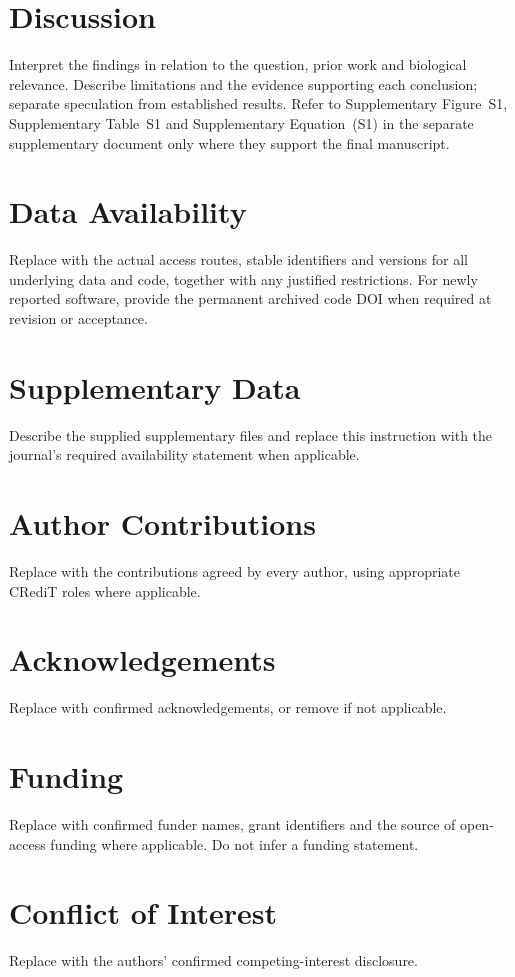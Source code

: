 \documentclass[unnumsec,webpdf,modern,large]{oup-authoring-template}
\begin{document}
\section{Discussion}\label{sec:discussion}
Interpret the findings in relation to the question, prior work and
biological relevance. Describe limitations and the evidence supporting
each conclusion; separate speculation from established results.
Refer to Supplementary Figure~S1, Supplementary Table~S1 and
Supplementary Equation~(S1) in the separate supplementary document
only where they support the final manuscript.

\section*{Data Availability}
Replace with the actual access routes, stable identifiers and versions
for all underlying data and code, together with any justified restrictions.
For newly reported software, provide the permanent archived code DOI
when required at revision or acceptance.

\section*{Supplementary Data}
Describe the supplied supplementary files and replace this instruction
with the journal's required availability statement when applicable.

\section*{Author Contributions}
Replace with the contributions agreed by every author, using appropriate
CRediT roles where applicable.

\section*{Acknowledgements}
Replace with confirmed acknowledgements, or remove if not applicable.

\section*{Funding}
Replace with confirmed funder names, grant identifiers and the source of
open-access funding where applicable. Do not infer a funding statement.

\section*{Conflict of Interest}
Replace with the authors' confirmed competing-interest disclosure.



\end{document}
